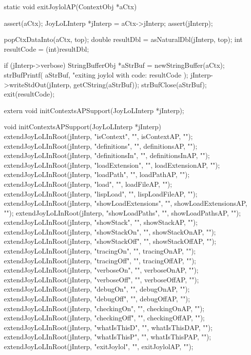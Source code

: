 \startCCode
static void exitJoylolAP(ContextObj *aCtx) {
  assert(aCtx);
  JoyLoLInterp *jInterp = aCtx->jInterp;
  assert(jInterp);
  
  popCtxDataInto(aCtx, top);
  double resultDbl  = asNaturalDbl(jInterp, top);
  int    resultCode = (int)resultDbl;
  
  if (jInterp->verbose) {
    StringBufferObj *aStrBuf = newStringBuffer(aCtx);
    strBufPrintf(
      aStrBuf,
      "exiting joylol with code: %
      resultCode
    );
    jInterp->writeStdOut(jInterp, getCString(aStrBuf));
    strBufClose(aStrBuf);
  }
  exit(resultCode);
}
\stopCCode

\startCHeader
extern void initContextsAPSupport(JoyLoLInterp *jInterp);
\stopCHeader
{}

\startCCode
void initContextsAPSupport(JoyLoLInterp *jInterp) {
  extendJoyLoLInRoot(jInterp, "isContext",          "", isContextAP,          "");
  extendJoyLoLInRoot(jInterp, "definitions",        "", definitionsAP,        "");
  extendJoyLoLInRoot(jInterp, "definitionsIn",      "", definitionsInAP,      "");
  extendJoyLoLInRoot(jInterp, "loadExtension",      "", loadExtensionAP,      "");
  extendJoyLoLInRoot(jInterp, "loadPath",           "", loadPathAP,           "");
  extendJoyLoLInRoot(jInterp, "load",               "", loadFileAP,           "");
  extendJoyLoLInRoot(jInterp, "lispLoad",           "", lispLoadFileAP,       "");
  extendJoyLoLInRoot(jInterp, "showLoadExtensions", "", showLoadExtensionsAP, "");
  extendJoyLoLInRoot(jInterp, "showLoadPaths",      "", showLoadPathsAP,      "");
  extendJoyLoLInRoot(jInterp, "showStack",          "", showStackAP,          "");
  extendJoyLoLInRoot(jInterp, "showStackOn",        "", showStackOnAP,        "");
  extendJoyLoLInRoot(jInterp, "showStackOff",       "", showStackOffAP,       "");
  extendJoyLoLInRoot(jInterp, "tracingOn",          "", tracingOnAP,          "");
  extendJoyLoLInRoot(jInterp, "tracingOff",         "", tracingOffAP,         "");
  extendJoyLoLInRoot(jInterp, "verboseOn",          "", verboseOnAP,          "");
  extendJoyLoLInRoot(jInterp, "verboseOff",         "", verboseOffAP,         "");
  extendJoyLoLInRoot(jInterp, "debugOn",            "", debugOnAP,            "");
  extendJoyLoLInRoot(jInterp, "debugOff",           "", debugOffAP,           "");
  extendJoyLoLInRoot(jInterp, "checkingOn",         "", checkingOnAP,         "");
  extendJoyLoLInRoot(jInterp, "checkingOff",        "", checkingOffAP,        "");
  extendJoyLoLInRoot(jInterp, "whatIsThisD",        "", whatIsThisDAP,        "");
  extendJoyLoLInRoot(jInterp, "whatIsThisP",        "", whatIsThisPAP,        "");
  extendJoyLoLInRoot(jInterp, "exitJoylol",         "", exitJoylolAP,         "");
}
\stopCCode
